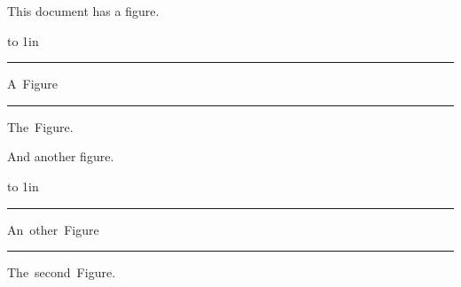 This document has a figure.


\topinsert
  \vbox to 1in {\hrule
    \vfill
    \hbox{A Figure}
    \vfill
    \hrule}
  \hbox{The Figure.}
\endinsert

And another figure.

\topinsert
  \vbox to 1in {\hrule
    \vfill
    \hbox{An other Figure}
    \vfill
    \hrule}
   \hbox{The second Figure.}
\endinsert

\vfill

\bye



